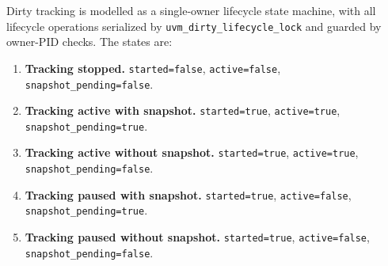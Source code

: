 Dirty tracking is modelled as a single-owner lifecycle state machine, with
all lifecycle operations serialized by
\texttt{uvm\_dirty\_lifecycle\_lock} and guarded by owner-PID checks.
The states are:
\begin{enumerate}
    \item \textbf{Tracking stopped.}
          \texttt{started=false}, \texttt{active=false},
          \texttt{snapshot\_pending=false}.
    \item \textbf{Tracking active with snapshot.}
          \texttt{started=true}, \texttt{active=true},
          \texttt{snapshot\_pending=true}.
    \item \textbf{Tracking active without snapshot.}
          \texttt{started=true}, \texttt{active=true},
          \texttt{snapshot\_pending=false}.
    \item \textbf{Tracking paused with snapshot.}
          \texttt{started=true}, \texttt{active=false},
          \texttt{snapshot\_pending=true}.
    \item \textbf{Tracking paused without snapshot.}
          \texttt{started=true}, \texttt{active=false},
          \texttt{snapshot\_pending=false}.
\end{enumerate}

